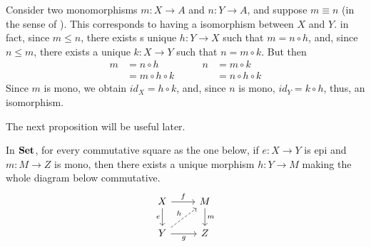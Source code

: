 \begin{obs}\label{obs:equiv_subobj_implies_isom_of_domains}
    Consider two monomorphisms $m: X \to A$ and $n: Y \to A$, and suppose $m \equiv n$ (in the sense of ). This corresponds to having a isomorphism between $X$ and $Y$. in fact, since $m \leq n$, there exists s unique $h: Y \to X$ such that $m = n \circ h$, and, since $n \leq m$, there exists a unique $k: X \to Y$ such that $n = m \circ k$. But then
    \[
        \begin{split}
            m &= n \circ h \\
              &= m \circ h \circ k
        \end{split}
        \qquad
        \begin{split}
            n &= m \circ k \\
              &= n \circ h \circ k
        \end{split}
    \]
    Since $m$ is mono, we obtain $id_X = h \circ k$, and, since $n$ is mono, $id_Y = k\circ h$, thus, an isomorphism. 
\end{obs}

The next proposition will be useful later.

\begin{prop}\label{prop:prop_epi_mono_Set}
    In $\mathbf{Set}$, for every commutative square as the one below, if $e: X \to Y$ is epi and $m: M \to Z$ is mono, then there exists a unique morphism $h: Y \to M$ making the whole diagram below commutative.
    \[
        \begin{tikzcd}
            X \ar[r, "f"] \ar[d, "e"swap] & M \ar[d, "m"] \\
            Y \ar[ur, dashed, "h"] \ar[r, "g"swap] & Z
        \end{tikzcd}
    \]
\end{prop}


